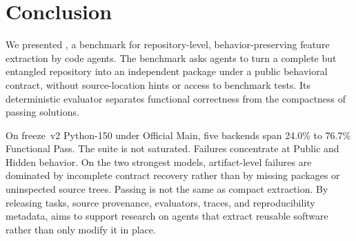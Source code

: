 \section{Conclusion}
\label{sec:conclusion}

We presented \flb, a benchmark for repository-level, behavior-preserving
feature extraction by code agents. The benchmark asks agents to turn a complete
but entangled repository into an independent package under a public behavioral
contract, without source-location hints or access to benchmark tests. Its
deterministic evaluator separates functional correctness from the compactness
of passing solutions.

On freeze~v2 Python-150 under Official Main, five backends span 24.0\% to
76.7\% Functional Pass. The suite is not saturated. Failures concentrate at
Public and Hidden behavior. On the two strongest models, artifact-level
failures are dominated by incomplete contract recovery rather than by missing
packages or uninspected source trees. Passing is not the same as compact
extraction. By releasing tasks, source provenance, evaluators, traces, and
reproducibility metadata, \flb aims to support research on agents that extract
reusable software rather than only modify it in place.
